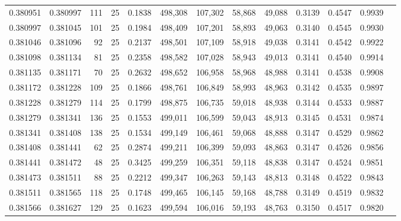 \begin{tabular}{rrrrrrrrrrrrr}
0.380951 & 0.380997 &   111 &  25 &                                     0.1838 & 498,308 & 107,302 &  58,868 &  49,088 & 0.3139 & 0.4547 & 0.9939 \\
0.380997 & 0.381045 &   101 &  25 &                                     0.1984 & 498,409 & 107,201 &  58,893 &  49,063 & 0.3140 & 0.4545 & 0.9930 \\
0.381046 & 0.381096 &    92 &  25 &                                     0.2137 & 498,501 & 107,109 &  58,918 &  49,038 & 0.3141 & 0.4542 & 0.9922 \\
0.381098 & 0.381134 &    81 &  25 &                                     0.2358 & 498,582 & 107,028 &  58,943 &  49,013 & 0.3141 & 0.4540 & 0.9914 \\
0.381135 & 0.381171 &    70 &  25 &                                     0.2632 & 498,652 & 106,958 &  58,968 &  48,988 & 0.3141 & 0.4538 & 0.9908 \\
0.381172 & 0.381228 &   109 &  25 &                                     0.1866 & 498,761 & 106,849 &  58,993 &  48,963 & 0.3142 & 0.4535 & 0.9897 \\
0.381228 & 0.381279 &   114 &  25 &                                     0.1799 & 498,875 & 106,735 &  59,018 &  48,938 & 0.3144 & 0.4533 & 0.9887 \\
0.381279 & 0.381341 &   136 &  25 &                                     0.1553 & 499,011 & 106,599 &  59,043 &  48,913 & 0.3145 & 0.4531 & 0.9874 \\
0.381341 & 0.381408 &   138 &  25 &                                     0.1534 & 499,149 & 106,461 &  59,068 &  48,888 & 0.3147 & 0.4529 & 0.9862 \\
0.381408 & 0.381441 &    62 &  25 &                                     0.2874 & 499,211 & 106,399 &  59,093 &  48,863 & 0.3147 & 0.4526 & 0.9856 \\
0.381441 & 0.381472 &    48 &  25 &                                     0.3425 & 499,259 & 106,351 &  59,118 &  48,838 & 0.3147 & 0.4524 & 0.9851 \\
0.381473 & 0.381511 &    88 &  25 &                                     0.2212 & 499,347 & 106,263 &  59,143 &  48,813 & 0.3148 & 0.4522 & 0.9843 \\
0.381511 & 0.381565 &   118 &  25 &                                     0.1748 & 499,465 & 106,145 &  59,168 &  48,788 & 0.3149 & 0.4519 & 0.9832 \\
0.381566 & 0.381627 &   129 &  25 &                                     0.1623 & 499,594 & 106,016 &  59,193 &  48,763 & 0.3150 & 0.4517 & 0.9820 \\

\end{tabular}
